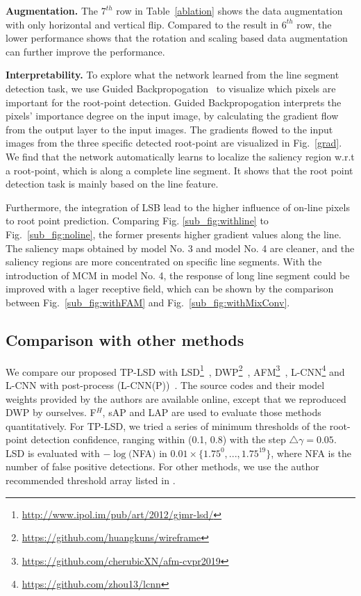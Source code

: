 \documentclass[runningheads]{llncs}
\begin{document}
\textbf{Augmentation.} The $7^{th}$ row in Table~\ref{ablation} shows the data augmentation with only horizontal and vertical flip. Compared to the result in $6^{th}$ row, the lower performance shows that the rotation and scaling based data augmentation can further improve the performance.



\textbf{Interpretability.} To explore what the network learned from the line segment detection task, we use Guided Backpropogation~\cite{backprop} to visualize which pixels are important for the root-point detection. Guided Backpropogation interprets the pixels' importance degree on the input image, by calculating the gradient flow from the output layer to the input images. 
The gradients flowed to the input images from the three specific detected root-point are visualized in Fig.~\ref{grad}. We find that the network automatically learns to localize the saliency region w.r.t a root-point, which is along a complete line segment. It shows that the root point detection task is mainly based on the line feature.

Furthermore, the integration of LSB lead to the higher influence of on-line pixels to root point prediction. Comparing Fig. \ref{sub_fig:withline} to Fig.~\ref{sub_fig:noline}, the former presents higher gradient values along the line. The saliency maps obtained by model No. 3 and model No. 4 are cleaner, and the saliency regions are more concentrated on specific line segments. With the introduction of MCM in model No. 4, the response of long line segment could be improved with a lager receptive field, which can be shown by the comparison between Fig.~\ref{sub_fig:withFAM} and Fig.~\ref{sub_fig:withMixConv}.

\setcounter{footnote}{0}
\subsection{Comparison with other methods}

We compare our proposed TP-LSD with LSD\footnote{\url{http://www.ipol.im/pub/art/2012/gjmr-lsd/}}~\cite{LSD}, DWP\footnote{\url{https://github.com/huangkuns/wireframe}}~\cite{Wireframe}, AFM\footnote{\url{https://github.com/cherubicXN/afm-cvpr2019}}~\cite{AFM}, L-CNN\footnote{\url{https://github.com/zhou13/lcnn}} and L-CNN with post-process (L-CNN(P))~\cite{LCNN}. The source codes and their model weights provided by the authors are available online, except that we reproduced DWP by ourselves. F$^H$, sAP and LAP are used to evaluate those methods quantitatively.
For TP-LSD, we tried a series of minimum thresholds of the root-point detection confidence, ranging within (0.1, 0.8) with the step $\triangle \gamma = 0.05$. LSD is evaluated with $-\log($NFA$)$ in $0.01 \times \{1.75^0, ..., 1.75^{19}\}$, where NFA is the number of false positive detections. For other methods, we use the author recommended threshold array listed in \cite{Wireframe, AFM, LCNN}.
\end{document}
